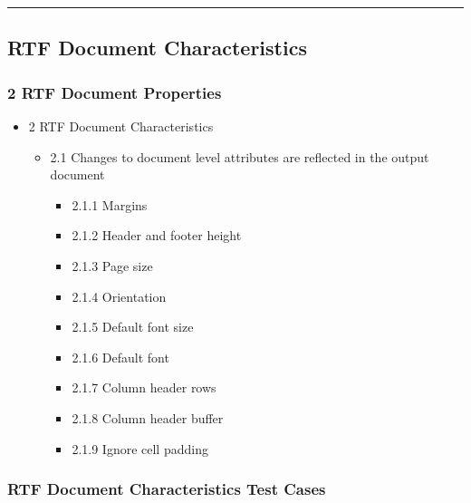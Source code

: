 \documentclass[]{article}
\providecommand{\tightlist}{%
  \setlength{\itemsep}{0pt}\setlength{\parskip}{0pt}}
\begin{document}
\begin{center}\rule{0.5\linewidth}{0.5pt}\end{center}

\hypertarget{rtf-document-characteristics}{%
\subsection{RTF Document
Characteristics}\label{rtf-document-characteristics}}

\hypertarget{rtf-document-properties}{%
\subsubsection{2 RTF Document
Properties}\label{rtf-document-properties}}

\begin{itemize}
\tightlist
\item
  2 RTF Document Characteristics

  \begin{itemize}
  \tightlist
  \item
    2.1 Changes to document level attributes are reflected in the output
    document

    \begin{itemize}
    \tightlist
    \item
      2.1.1 Margins
    \item
      2.1.2 Header and footer height
    \item
      2.1.3 Page size
    \item
      2.1.4 Orientation
    \item
      2.1.5 Default font size
    \item
      2.1.6 Default font
    \item
      2.1.7 Column header rows
    \item
      2.1.8 Column header buffer
    \item
      2.1.9 Ignore cell padding
    \end{itemize}
  \end{itemize}
\end{itemize}

\hypertarget{rtf-document-characteristics-test-cases}{%
\subsubsection{RTF Document Characteristics Test
Cases}\label{rtf-document-characteristics-test-cases}}
\end{document}
